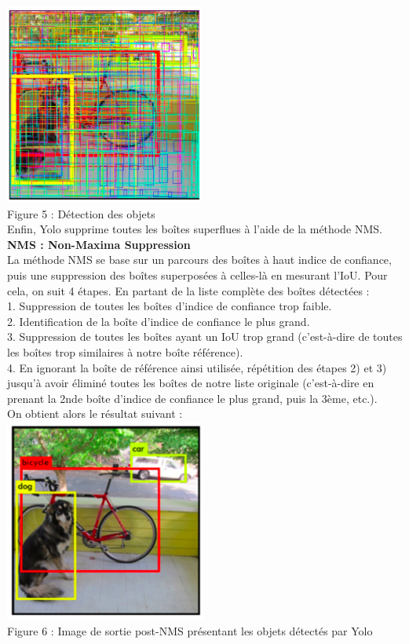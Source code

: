 \documentclass[a4paper, 13px]{article}
\begin{document}
 \includegraphics[scale=0.8]{img6.png}\\
Figure 5 : Détection des objets\\

Enfin, Yolo supprime toutes les boîtes superflues à l’aide de la méthode NMS.\\
{\bfseries {NMS : Non-Maxima Suppression }}\\
La méthode NMS se base sur un parcours des boîtes à haut indice de confiance, puis une suppression des boîtes superposées à celles-là en mesurant l’IoU. Pour cela, on suit 4 étapes. En partant de la liste complète des boîtes détectées :\\
1.	Suppression de toutes les boîtes d’indice de confiance trop faible.\\
2.	Identification de la boîte d’indice de confiance le plus grand.\\
3.	Suppression de toutes les boîtes ayant un IoU trop grand (c’est-à-dire de toutes les boîtes trop similaires à notre boîte référence).\\
4.	En ignorant la boîte de référence ainsi utilisée, répétition des étapes 2) et 3) jusqu’à avoir éliminé toutes les boîtes de notre liste originale (c’est-à-dire en prenant la 2nde boîte d’indice de confiance le plus grand, puis la 3ème, etc.).\\
On obtient alors le résultat suivant :\\
 \includegraphics[scale=0.8]{img7.png}\\
 Figure 6 : Image de sortie post-NMS présentant les objets détectés par Yolo\\
 
\end{document}
